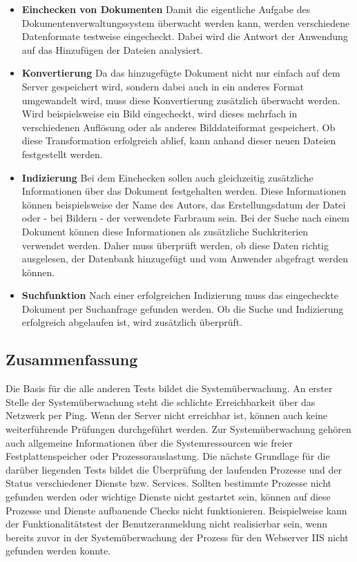 \begin{itemize}

\item \textbf{Einchecken von Dokumenten} Damit die eigentliche Aufgabe des Dokumentenverwaltungssystem überwacht werden kann, werden verschiedene Datenformate testweise eingecheckt. 
Dabei wird die Antwort der Anwendung auf das Hinzufügen der Dateien analysiert.

\item \textbf{Konvertierung} Da das hinzugefügte Dokument nicht nur einfach auf dem Server gespeichert wird, sondern dabei auch in ein anderes Format umgewandelt wird, muss diese Konvertierung zusätzlich überwacht werden. 
Wird beispielsweise ein Bild eingecheckt, wird dieses mehrfach in verschiedenen Auflösung oder als anderes Bilddateiformat gespeichert. 
Ob diese Transformation erfolgreich ablief, kann anhand dieser neuen Dateien festgestellt werden.

\item \textbf{Indizierung} Bei dem Einchecken sollen auch gleichzeitig zusätzliche Informationen über das Dokument festgehalten werden. 
Diese Informationen können beispielsweise der Name des Autors, das Erstellungsdatum der Datei oder - bei Bildern - der verwendete Farbraum sein. 
Bei der Suche nach einem Dokument können diese Informationen als zusätzliche Suchkriterien verwendet werden.
Daher muss überprüft werden, ob diese Daten richtig ausgelesen, der Datenbank hinzugefügt und vom Anwender abgefragt werden können. %

\item \textbf{Suchfunktion} Nach einer erfolgreichen Indizierung muss das eingecheckte Dokument per Suchanfrage gefunden werden.
Ob die Suche und Indizierung erfolgreich abgelaufen ist, wird zusätzlich überprüft. 
\end{itemize}

\subsection{Zusammenfassung}

Die Basis für die alle anderen Tests bildet die Systemüberwachung.
An erster Stelle der Systemüberwachung steht die schlichte Erreichbarkeit über das Netzwerk per Ping.
Wenn der Server nicht erreichbar ist, können auch keine weiterführende Prüfungen durchgeführt werden.
Zur Systemüberwachung gehören auch allgemeine Informationen über die Systemressourcen wie freier Festplattenspeicher oder Prozessorauslastung.
Die nächste Grundlage für die darüber liegenden Tests bildet die Überprüfung der laufenden Prozesse und der Status verschiedener Dienste bzw. Services.
Sollten bestimmte Prozesse nicht gefunden werden oder wichtige Dienste nicht gestartet sein, können auf diese Prozesse und Dienste aufbauende Checks nicht funktionieren.
Beispielweise kann der Funktionalitätstest der Benutzeranmeldung nicht realisierbar sein, wenn bereits zuvor in der Systemüberwachung der Prozess für den Webserver \gls{IIS} nicht gefunden werden konnte.\\


